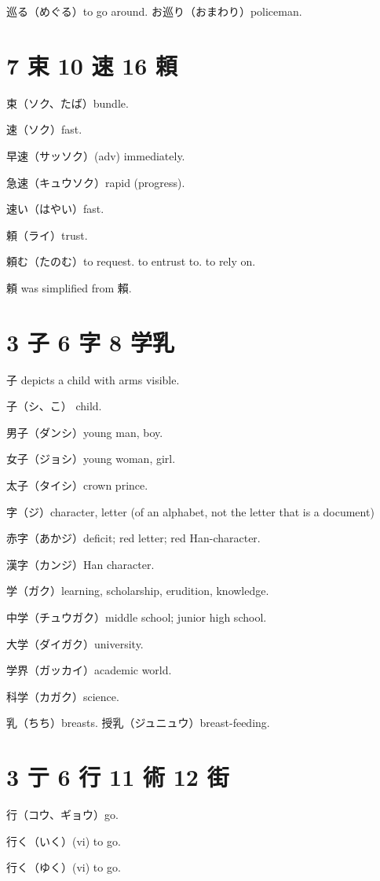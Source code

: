巡る（めぐる）to go around.
お巡り（おまわり）policeman.

\section{7 束 10 速 16 頼}

束（ソク、たば）bundle.

速（ソク）fast.

早速（サッソク）(adv) immediately.

急速（キュウソク）rapid (progress).

速い（はやい）fast.

頼（ライ）trust.

頼む（たのむ）to request. to entrust to. to rely on.

頼 was simplified from 賴.

\section{3 子 6 字 8 学乳}

子 depicts a child with arms visible.

子（シ、こ） child.

男子（ダンシ）young man, boy.

女子（ジョシ）young woman, girl.

太子（タイシ）crown prince.

字（ジ）character, letter (of an alphabet, not the letter that is a document)

赤字（あかジ）deficit; red letter; red Han-character.

漢字（カンジ）Han character.

学（ガク）learning, scholarship, erudition, knowledge.

中学（チュウガク）middle school; junior high school.

大学（ダイガク）university.

学界（ガッカイ）academic world.

科学（カガク）science.

乳（ちち）breasts.
授乳（ジュニュウ）breast-feeding.

\section{3 亍 6 行 11 術 12 街}

行（コウ、ギョウ）go.

行く（いく）(vi) to go.

行く（ゆく）(vi) to go.


